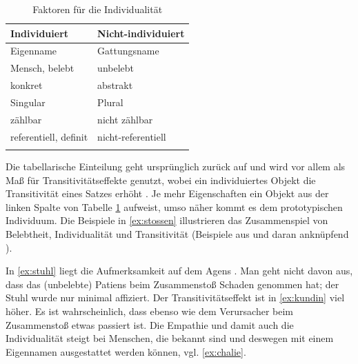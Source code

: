 \begin{table}[h]
\begin{tabular}{ll}
\lsptoprule
Individuiert & Nicht-individuiert\\ \midrule
Eigenname                    & Gattungsname         \\
Mensch, belebt               & unbelebt             \\
konkret                      & abstrakt             \\
Singular                     & Plural               \\
zählbar                      & nicht zählbar        \\
referentiell, definit        & nicht-referentiell   \\ \lspbottomrule
\end{tabular}
\caption{Faktoren für die Individualität \parencite[253]{Hopper1980}\label{tab:indi}}
\end{table}

Die tabellarische Einteilung geht ursprünglich zurück auf \textcite{Timberlake1975,Timberlake1977} und wird vor allem als Maß für Transitivitätseffekte genutzt, wobei ein individuiertes Objekt die Transitivität eines Satzes erhöht \parencite[s. auch][]{Gillmann2016}. Je mehr Eigenschaften ein Objekt aus der linken Spalte von Tabelle \ref{tab:indi} aufweist, umso näher kommt es dem prototypischen Individuum. Die Beispiele in \ref{ex:stossen} illustrieren das Zusammenspiel von Belebtheit, Individualität und Transitivität (Beispiele aus \cite[253]{Hopper1980} und daran anknüpfend \cite[344]{Szczepaniak2011}).


\begin{exe}
	\ex \label{ex:stossen}
	\begin{xlist}
		\ex \label{ex:stuhl} 
 		\ex \label{ex:kundin} 
		\ex \label{ex:chalie} 
	\end{xlist}
\end{exe}
\noindent
In \ref{ex:stuhl} liegt die Aufmerksamkeit auf dem Agens . Man geht nicht davon aus, dass das (unbelebte) Patiens  beim  Zusammenstoß Schaden genommen hat; der Stuhl wurde nur minimal affiziert. Der Transitivitätseffekt ist in \ref{ex:kundin} viel höher. Es ist wahrscheinlich, dass  ebenso wie dem Verursacher beim Zusammenstoß etwas passiert ist. Die Empathie und damit auch die Individualität steigt bei Menschen, die bekannt sind und deswegen mit einem Eigennamen ausgestattet werden können, vgl. \ref{ex:chalie}.


